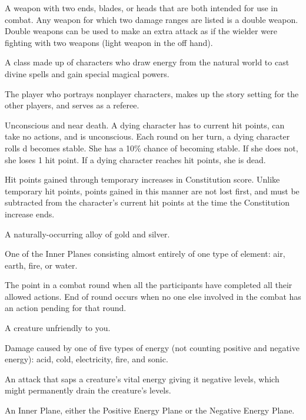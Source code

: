  A weapon with two ends, blades, or heads that 
are both intended for use in combat. Any weapon for which two 
damage ranges are listed is a double weapon. Double weapons can be 
used to make an extra attack as if the wielder were fighting with two 
weapons (light weapon in the off hand).

 A class made up of characters who draw energy 
from the natural world to cast divine spells and gain special magical 
powers. 

 The player who portrays nonplayer 
characters, makes up the story setting for the other players, and 
serves as a referee. 

 Unconscious and near death. A dying character has  to  current hit points, can take no actions, and is unconscious. Each 
round on her turn, a dying character rolls d%
becomes stable. She has a 10\% chance of becoming stable. If she 
does not, she loses 1 hit point. If a dying character reaches  hit 
points, she is dead. 

 Hit points gained through temporary increases in Constitution score. Unlike temporary hit points, 
points gained in this manner are not lost first, and must be 
subtracted from the character's current hit points at the time the 
Constitution increase ends. 

 A naturally-occurring alloy of gold and silver. 

 One of the Inner Planes consisting almost 
entirely of one type of element: air, earth, fire, or water. 

 The point in a combat round when all the participants have completed all their allowed actions. End of round 
occurs when no one else involved in the combat has an action 
pending for that round. 

 A creature unfriendly to you. 

 Damage caused by one of five types of energy 
(not counting positive and negative energy): acid, cold, electricity, 
fire, and sonic. 

 An attack that saps a creature's vital energy giving 
it negative levels, which might permanently drain the creature's levels. 

 An Inner Plane, either the Positive Energy Plane 
or the Negative Energy Plane. 


